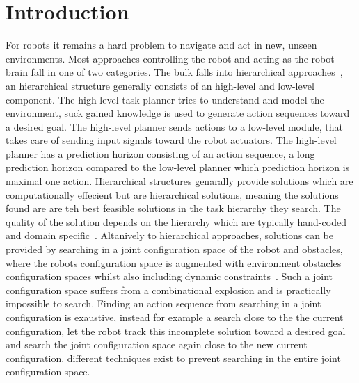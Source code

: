\chapter{Introduction}
\label{chap:introduction}
For robots it remains a hard problem to navigate and act in new, unseen environments. Most approaches controlling the robot and acting as the robot brain fall in one of two categories. The bulk falls into hierarchical approaches~\cite{kaelbling_hierarchical_2011,scholz_navigation_2016,krontiris_dealing_2015}, an hierarchical structure generally consists of an high-level and low-level component. The high-level task planner tries to understand and model the environment, suck gained knowledge is used to generate action sequences toward a desired goal. The high-level planner sends actions to a low-level module, that takes care of sending input signals toward the robot actuators. The high-level planner has a prediction horizon consisting of an action sequence, a long prediction horizon compared to the low-level planner which prediction horizon is maximal one action. Hierarchical structures genarally provide solutions which are computationally effecient but are hierarchical solutions, meaning the solutions found are are teh best feasible solutions in the task hierarchy they search. The quality of the solution depends on the hierarchy which are typically hand-coded and domain specific~\cite{vega-brown_asymptotically_2020}. Altanively to hierarchical approaches, solutions can be provided by searching in a joint configuration space of the robot and obstacles, where the robots configuration space is augmented with environment obstacles configuration spaces whilst also including dynamic constraints~\cite{hauser_multimodal_2010,berenson_manipulation_2009,jaillet_path_2013}. Such a joint configuration space suffers from a combinational explosion and is practically impossible to search. Finding an action sequence from searching in a joint configuration is exaustive, instead for example a search close to the the current configuration, let the robot track this incomplete solution toward a desired goal and search the joint configuration space again close to the new current configuration. different techniques exist to prevent searching in the entire joint configuration space.\bs

